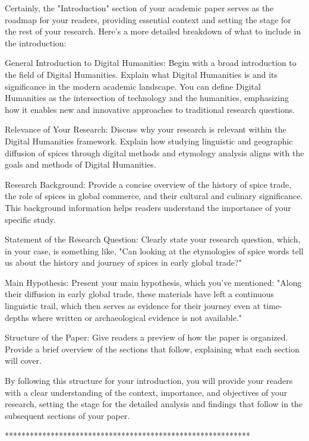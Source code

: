 \documentclass{dsh} %
\begin{document}
Certainly, the "Introduction" section of your academic paper serves as the roadmap for your readers, providing essential context and setting the stage for the rest of your research. Here's a more detailed breakdown of what to include in the introduction:

    General Introduction to Digital Humanities:
        Begin with a broad introduction to the field of Digital Humanities. Explain what Digital Humanities is and its significance in the modern academic landscape. You can define Digital Humanities as the intersection of technology and the humanities, emphasizing how it enables new and innovative approaches to traditional research questions.

    Relevance of Your Research:
        Discuss why your research is relevant within the Digital Humanities framework. Explain how studying linguistic and geographic diffusion of spices through digital methods and etymology analysis aligns with the goals and methods of Digital Humanities.

    Research Background:
        Provide a concise overview of the history of spice trade, the role of spices in global commerce, and their cultural and culinary significance. This background information helps readers understand the importance of your specific study.

    Statement of the Research Question:
        Clearly state your research question, which, in your case, is something like, "Can looking at the etymologies of spice words tell us about the history and journey of spices in early global trade?"

    Main Hypothesis:
        Present your main hypothesis, which you've mentioned: "Along their diffusion in early global trade, these materials have left a continuous linguistic trail, which then serves as evidence for their journey even at time-depths where written or archaeological evidence is not available."

    Structure of the Paper:
        Give readers a preview of how the paper is organized. Provide a brief overview of the sections that follow, explaining what each section will cover.

By following this structure for your introduction, you will provide your readers with a clear understanding of the context, importance, and objectives of your research, setting the stage for the detailed analysis and findings that follow in the subsequent sections of your paper.

***********************************************************
\end{document}
